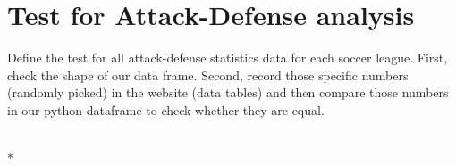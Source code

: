 \documentclass[letterpaper,10pt,english]{/usr/local/lib/python2.7/dist-packages/sphinx/texinputs/sphinxhowto}
\def\smaller{\fontsize{9.5pt}{9.5pt}\selectfont}
\begin{document}
\section{Test for Attack-Defense analysis}Define the test for all attack-defense statistics data for each soccer
league. First, check the shape of our data frame. Second, record those
specific numbers (randomly picked) in the website (data tables) and then
compare those numbers in our python dataframe to check whether they are
equal.


    
        \vspace{6pt}
        \makebox[0.1\linewidth]{\smaller\hfill\tt\color{nbframe-in-prompt}In\hspace{4pt}{[}44{]}:\hspace{4pt}}\\*
        \vspace{-2.65\baselineskip}
\end{document}
